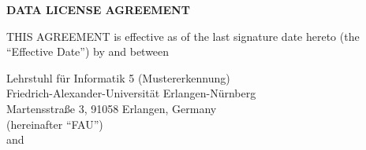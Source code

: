 \documentclass[11pt]{article}
\begin{document}
  \pagestyle{fancy}

  \vspace*{-1cm}
  \begin{center}
    \Large \sffamily \textbf{DATA LICENSE AGREEMENT} \\[2em]
  \end{center}

  THIS AGREEMENT is effective as of the last signature date hereto (the ``Effective Date'') by and between
%
  \begin{center}
    Lehrstuhl f{\"u}r Informatik 5 (Mustererkennung) \\
    Friedrich-Alexander-Universit{\"a}t Erlangen-N{\"u}rnberg \\
    Martensstra{\ss}e 3, 91058 Erlangen, Germany \\[0.2cm]
    (hereinafter ``FAU'') \\[.5cm]

    and
  \end{center}
  \vspace{-.1cm}
\end{document}
